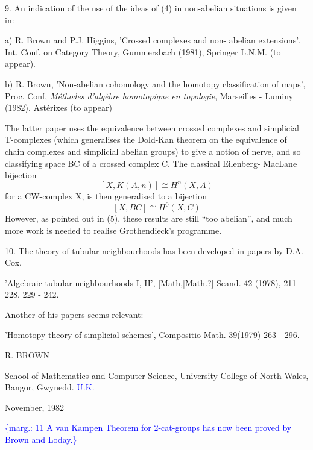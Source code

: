 \documentclass[11pt]{article}
\newcommand{\scanpage}[1]{\par\bigskip\noindent{\small\sffamily[scan #1]}\par}
\newcommand{\mspage}[1]{{\small\sffamily[p.\,#1]}}
\newcommand{\hand}[1]{\textcolor{blue}{#1}}
\newcommand{\margin}[1]{\textcolor{blue}{\{\textsf{marg.:} #1\}}}
\newcommand{\unsure}[1]{[#1?]}
\begin{document}
9. An indication of the use of the ideas of (4) in non-abelian
situations is given in:

a) R. Brown and P.J. Higgins, 'Crossed complexes and non-%
abelian extensions', Int. Conf. on Category Theory, Gummersbach
(1981),  Springer L.N.M. (to appear).

b) R. Brown, 'Non-abelian cohomology and the homotopy classification
of maps', Proc. Conf, \textit{Méthodes d'algèbre homotopique en topologie},
Marseilles - Luminy (1982).  Astérixes (to appear)

\mspage{\hand{120}}

\clearpage
\scanpage{134-2/120}
\mspage{-4-}

The latter paper uses the equivalence between crossed complexes
and simplicial T-complexes (which generalises the Dold-Kan
theorem on the equivalence of chain complexes and simplicial
abelian groups) to give a notion of nerve, and so classifying
space BC of a crossed complex C. The classical Eilenberg-%
MacLane bijection
\[ [X, K(A, n)] \cong H^{n} (X, A) \]
for a CW-complex X, is then generalised to a bijection
\[ [X, BC] \cong H^{0} (X, C) \]
However, as pointed out in (5), these results are still ``too
abelian'', and much more work is needed to realise Grothendieck's
programme.

10. The theory of tubular neighbourhoods has been developed in papers
by D.A. Cox.

'Algebraic tubular neighbourhoods I, II', \unsure{Math,|Math.} Scand. 42 (1978),
211 - 228, 229 - 242.

Another of his papers seems relevant:

'Homotopy theory of simplicial schemes', Compositio Math. 39(1979)
263 - 296.

R. BROWN

School of Mathematics and Computer Science,
University College of North Wales,
Bangor,
Gwynedd. \hand{U.K.}

November, 1982

\margin{11 A van Kampen Theorem for 2-cat-groups has now
been proved by Brown and Loday.}

\mspage{\hand{121}}
\end{document}
